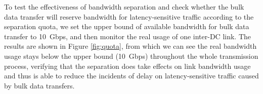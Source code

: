 To test the effectiveness of bandwidth separation and check whether the bulk data transfer will reserve bandwidth for latency-sensitive traffic according to the separation quota, we set the upper bound of available bandwidth for bulk data transfer to 10~Gbps, and then monitor the real usage of one inter-DC link. The results are shown in Figure \ref{fig:quota}, from which we can see the real bandwidth usage stays below the upper bound (10~Gbps) throughout the whole transmission process, verifying that the separation does take effects on link bandwidth usage and thus is able to reduce the incidents of delay on latency-sensitive traffic caused by bulk data transfers.

\begin{table}[t]
\begin{center}
\end{center}
\caption{Average link utilizations under \company and \name.}
\label{table:usage}
\vspace{-0.4cm}
\end{table}

